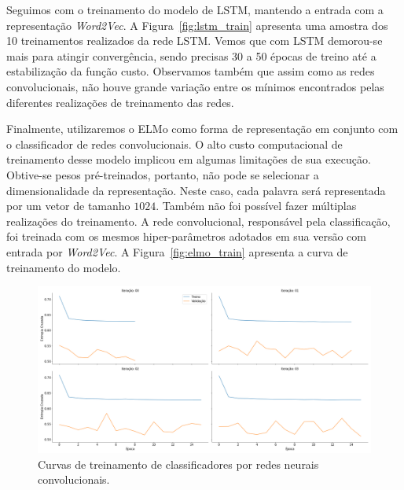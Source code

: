Seguimos com o treinamento do modelo de LSTM, mantendo a entrada com a
representação \textit{Word2Vec}.
A Figura~\ref{fig:lstm_train} apresenta uma amostra dos 10 treinamentos
realizados da rede LSTM.
Vemos que com LSTM demorou-se mais para atingir convergência, sendo precisas
30 a 50 épocas de treino até a estabilização da função custo.
Observamos também que assim como as redes convolucionais, não houve grande
variação entre os mínimos encontrados pelas diferentes realizações de
treinamento das redes.

Finalmente, utilizaremos o ELMo como forma de representação em conjunto com o
classificador de redes convolucionais.
O alto custo computacional de treinamento desse modelo implicou em algumas
limitações de sua execução.
Obtive-se pesos pré-treinados, portanto, não pode se selecionar a
dimensionalidade da representação.
Neste caso, cada palavra será representada por um vetor de tamanho $1024$.
Também não foi possível fazer múltiplas realizações do treinamento.
A rede convolucional, responsável pela classificação, foi treinada com os mesmos
hiper-parâmetros adotados em sua versão com entrada por \textit{Word2Vec}.
A Figura~\ref{fig:elmo_train} apresenta a curva de treinamento do modelo.


\begin{figure}[h]
\begin{center} {
    \begin{center}
    \includegraphics[scale=0.25]{images/cnn_train.png}
    \caption{Curvas de treinamento de classificadores por redes neurais
        convolucionais.}
    \label{fig:cnn_train}
    \end{center}
}
\end{center}
\end{figure}


